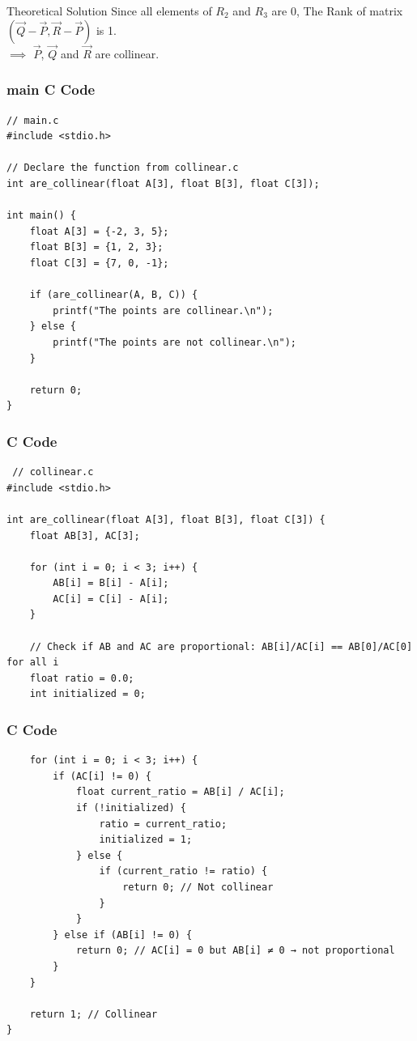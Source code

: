 \documentclass{beamer}
\begin{document}
\begin{frame}{Theoretical Solution}
Since all elements of $R_2$ and $R_3$ are 0, The Rank of matrix $(\vec{Q} - \vec{P},\vec{R} - \vec{P})$ is 1.  \\
$\implies$ $\vec{P}$, $\vec{Q}$ and $\vec{R}$ are collinear.
\end{frame}


\begin{frame}[fragile]
    \frametitle{main C Code}

    \begin{lstlisting}
// main.c
#include <stdio.h>

// Declare the function from collinear.c
int are_collinear(float A[3], float B[3], float C[3]);

int main() {
    float A[3] = {-2, 3, 5};
    float B[3] = {1, 2, 3};
    float C[3] = {7, 0, -1};

    if (are_collinear(A, B, C)) {
        printf("The points are collinear.\n");
    } else {
        printf("The points are not collinear.\n");
    }

    return 0;
}
    \end{lstlisting}
\end{frame}

\begin{frame}[fragile]
    \frametitle{C Code}

    \begin{lstlisting}
 // collinear.c
#include <stdio.h>

int are_collinear(float A[3], float B[3], float C[3]) {
    float AB[3], AC[3];

    for (int i = 0; i < 3; i++) {
        AB[i] = B[i] - A[i];
        AC[i] = C[i] - A[i];
    }

    // Check if AB and AC are proportional: AB[i]/AC[i] == AB[0]/AC[0] for all i
    float ratio = 0.0;
    int initialized = 0;
    \end{lstlisting}
\end{frame}

\begin{frame}[fragile]
    \frametitle{C Code}

    \begin{lstlisting}
    for (int i = 0; i < 3; i++) {
        if (AC[i] != 0) {
            float current_ratio = AB[i] / AC[i];
            if (!initialized) {
                ratio = current_ratio;
                initialized = 1;
            } else {
                if (current_ratio != ratio) {
                    return 0; // Not collinear
                }
            }
        } else if (AB[i] != 0) {
            return 0; // AC[i] = 0 but AB[i] ≠ 0 → not proportional
        }
    }

    return 1; // Collinear
}
    \end{lstlisting}
\end{frame}
\end{document}
